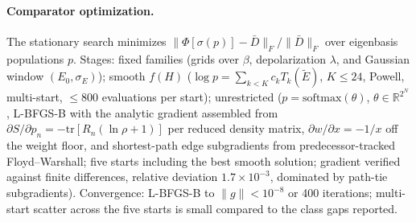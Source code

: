 \documentclass[a4paper,11pt,noarxiv]{quantumarticle}
\begin{document}
\paragraph{Comparator optimization.} The stationary search minimizes
$\lVert\Phi[\sigma(p)] - \bar D\rVert_F / \lVert\bar D\rVert_F$ over
eigenbasis populations $p$. Stages: fixed families (grids over
$\beta$, depolarization $\lambda$, and Gaussian window $(E_0,
\sigma_E)$); smooth $f(H)$ ($\log p = \sum_{k<K}
c_k T_k(\tilde E)$, $K \leq 24$, Powell, multi-start, $\leq 800$
evaluations per start); unrestricted ($p = \mathrm{softmax}(\theta)$,
$\theta \in \mathbb{R}^{2^N}$, L-BFGS-B with the analytic gradient
assembled from $\partial S/\partial p_n = -\mathrm{tr}[R_n(\ln\rho +
1)]$ per reduced density matrix, $\partial w/\partial x = -1/x$ off
the weight floor, and shortest-path edge subgradients from
predecessor-tracked Floyd--Warshall; five starts including the best
smooth solution; gradient verified against finite differences,
relative deviation $1.7\times10^{-3}$, dominated by path-tie
subgradients). Convergence: L-BFGS-B to $\lVert g\rVert < 10^{-8}$ or
400 iterations; multi-start scatter across the five starts is small
compared to the class gaps reported.
\end{document}

